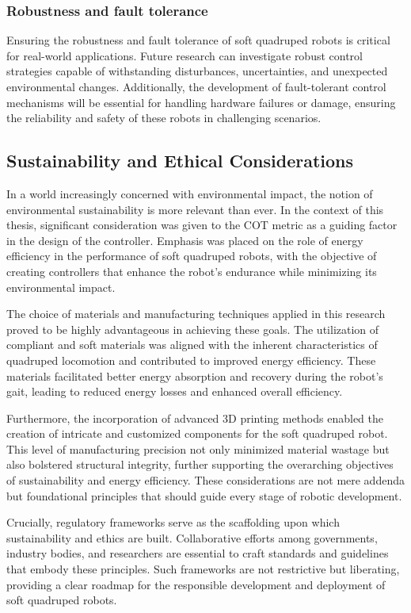 \subsubsection*{Robustness and fault tolerance}
Ensuring the robustness and fault tolerance of soft quadruped robots is critical for real-world applications. Future research can investigate robust control strategies capable of withstanding disturbances, uncertainties, and unexpected environmental changes. Additionally, the development of fault-tolerant control mechanisms will be essential for handling hardware failures or damage, ensuring the reliability and safety of these robots in challenging scenarios.

\subsection{Sustainability and Ethical Considerations}
In a world increasingly concerned with environmental impact, the notion of environmental sustainability is more relevant than ever. In the context of this thesis, significant consideration was given to the COT metric as a guiding factor in the design of the controller. Emphasis was placed on the role of energy efficiency in the performance of soft quadruped robots, with the objective of creating controllers that enhance the robot's endurance while minimizing its environmental impact.

The choice of materials and manufacturing techniques applied in this research proved to be highly advantageous in achieving these goals. The utilization of compliant and soft materials was aligned with the inherent characteristics of quadruped locomotion and contributed to improved energy efficiency. These materials facilitated better energy absorption and recovery during the robot's gait, leading to reduced energy losses and enhanced overall efficiency.

Furthermore, the incorporation of advanced 3D printing methods enabled the creation of intricate and customized components for the soft quadruped robot. This level of manufacturing precision not only minimized material wastage but also bolstered structural integrity, further supporting the overarching objectives of sustainability and energy efficiency. These considerations are not mere addenda but foundational principles that should guide every stage of robotic development.

Crucially, regulatory frameworks serve as the scaffolding upon which sustainability and ethics are built. Collaborative efforts among governments, industry bodies, and researchers are essential to craft standards and guidelines that embody these principles. Such frameworks are not restrictive but liberating, providing a clear roadmap for the responsible development and deployment of soft quadruped robots.

